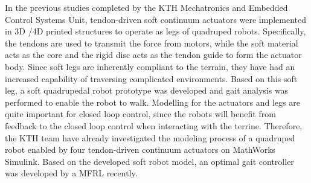 In the previous studies\cite{thorapallimuralidharanContinuumActuatorBased2020} completed by the KTH Mechatronics and Embedded Control Systems Unit, tendon-driven soft continuum actuators were implemented in \ac{3D} /\ac{4D} printed structures to operate as legs of quadruped robots. Specifically, the tendons are used to transmit the force from motors, while the soft material acts as the core and the rigid disc acts as the tendon guide to form the actuator body. Since soft legs are inherently compliant to the terrain, they have had an increased capability of traversing complicated environments. Based on this soft leg, a soft quadrupedal robot prototype was developed and gait analysis was performed to enable the robot to walk\cite{daneliaStructureGaitOptimizationof2021}. Modelling for the actuators and legs are quite important for closed loop control, since the robots will benefit from feedback to the closed loop control when interacting with the terrine. Therefore, the KTH team\cite{muralidharanSoftQuadrupedRobot2021} have already investigated the modeling process of a quadruped robot enabled by four tendon-driven continuum actuators on MathWorks Simulink\textsuperscript{\textregistered}. Based on the developed soft robot model, an optimal gait controller was developed by a \ac{MFRL}\cite{jiSynthesizingOptimalGait2022} recently.

